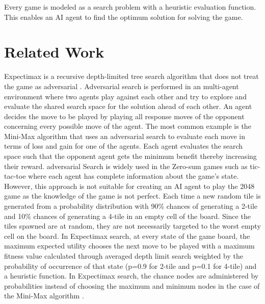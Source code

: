 \documentclass{svproc}
\begin{document}
    Every game is modeled as a search problem with a heuristic evaluation function. This enables an AI agent to find the optimum solution for solving the game.
    \section{Related Work}

    Expectimax is a recursive depth-limited tree search algorithm that does not treat the game as adversarial \cite{Maryam}. Adversarial search is performed in an multi-agent environment where two agents play against each other and try to explore and evaluate the shared search space for the solution ahead of each other. An agent decides the move to be played by playing all response moves of the opponent concerning every possible move of the agent. The most common example is the Mini-Max algorithm \cite{7162574, Dan} that uses an adversarial search to evaluate each move in terms of loss and gain for one of the agents. Each agent evaluates the search space such that the opponent agent gets the minimum benefit thereby increasing their reward. adversarial Search is widely used in the Zero-sum games such as tic-tac-toe where each agent has complete information about the game’s state. However, this approach is not suitable for creating an AI agent to play the 2048 game as the knowledge of the game is not perfect. Each time a new random tile is generated from a probability distribution with 90\% chances of generating a 2-tile and 10\% chances of generating a 4-tile in an empty cell of the board. Since the tiles spawned are at random, they are not necessarily targeted to the worst empty cell on the board. In Expectimax search, at every state of the game board, the maximum expected utility \cite{Maryam} chooses the next move to be played with a maximum fitness value calculated through averaged depth limit search weighted by the probability of occurrence of that state (p=0.9 for 2-tile and p=0.1 for 4-tile) and a heuristic function. In Expectimax search, the chance nodes are administered by probabilities instead of choosing the maximum and minimum nodes in the case of the Mini-Max algorithm \cite{7162574}.
\end{document}
